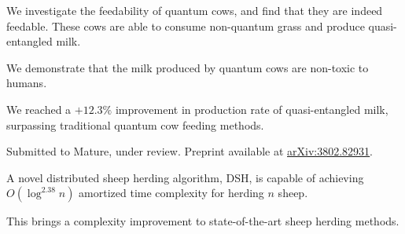 \begin{resumePublicationSection}
    \resumePublicationEntry[
        title = {On the Feedability of Quantum Cows},
        date = {Apr. 2038},
        author = {John Smith\footnotemark[1], Jim Author\footnotemark[1], Humphrey Orangeby, Ian Strucktor}
    ]
    \begin{resumePublicationEntryBody}
        \item We investigate the feedability of quantum cows, and find that they are indeed feedable.
            These cows are able to consume non-quantum grass and produce quasi-entangled milk.
        \item We demonstrate that the milk produced by quantum cows are non-toxic to humans.
        \item We reached a $+12.3\%$ improvement in production rate of quasi-entangled milk, surpassing
            traditional quantum cow feeding methods.
        \item Submitted to Mature, under review. Preprint available at \href{https://arxiv.org/abs/3802.82931}{\underline{arXiv:3802.82931}}.
    \end{resumePublicationEntryBody}
    
    \resumePublicationEntry[
        title = {DSH: Effective Distributed Sheep Herding},
        date = {Mar. 2038},
        author = {Bernard Woolies, John Smith, Jim Author, Ian Strucktor}
    ]
    \begin{resumePublicationEntryBody}
        \item A novel distributed sheep herding algorithm, DSH, is capable of achieving $O(\log^{2.38} n)$ amortized
            time complexity for herding $n$ sheep.
        \item This brings a complexity improvement to state-of-the-art sheep herding methods.
    \end{resumePublicationEntryBody}
\end{resumePublicationSection}

\begin{resumeAwardSection}
    \resumeAwardEntry[
        prize = Metal medal,
        name = Non-international Obfuscated Scripting Code Contest (NiOSCC),
        time = Feb. 2038,
    ]
    \resumeAwardEntry[
        prize = Metal medal,
        name = 42th ICPC Atlantica Regional Contest Claydon Site,
        time = Jan. 2038,
    ]
    \resumeAwardEntry[
        prize = Metal medal,
        name = 1970 Atlantica Collegiate Programming Contest,
        time = Jan. 1970,
    ]
\end{resumeAwardSection}

